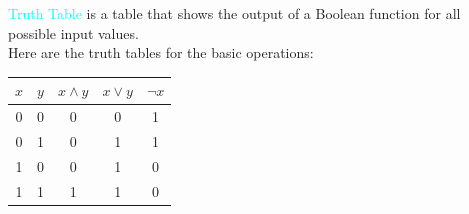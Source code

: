 \documentclass{book}
\begin{document}
\textcolor{cyan}{Truth Table} is a table that shows the output of a Boolean function for all possible input values.\\
Here are the truth tables for the basic operations:
\begin{center}
    \begin{tabular}{|c|c|c|c|c|}
        \hline
        \rowcolor{lightblue}
        \(x\) & \(y\) & \(x \land y\) & \(x \lor y\) & \(\neg x\)\\
        \hline
        0 & 0 & 0 & 0 & 1\\
        0 & 1 & 0 & 1 & 1\\
        1 & 0 & 0 & 1 & 0\\
        1 & 1 & 1 & 1 & 0\\
        \hline
    \end{tabular}
\end{center}
\end{document}
